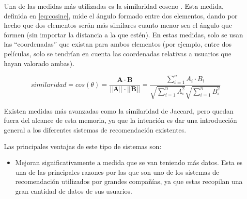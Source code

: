 Una de las medidas más utilizadas es la similaridad coseno \cite{resnick}. Esta medida, definida en \ref{eq:cosine}, mide el ángulo formado entre dos elementos, dando por hecho que dos elementos serán más similares cuanto menor sea el ángulo que formen (sin importar la distancia a la que estén). En estas medidas, solo se usan las ``coordenadas'' que existan para ambos elementos (por ejemplo, entre dos películas, solo se tendrían en cuenta las coordenadas relativas a usuarios que hayan valorado ambas).

\begin{equation}
    similaridad = cos\left(\theta\right) = \frac{\mathbf{A}\cdot \mathbf{B}}{||\mathbf{A}||\cdot ||\mathbf{B}||} = \frac{\sum_{i=1}^{n}{A_i \cdot B_i}}{\sqrt{\sum_{i=1}^{n}{A_i^2}}\sqrt{\sum_{i=1}^{n}{B_i^2}}}
    \label{eq:cosine}
\end{equation}

Existen medidas más avanzadas como la similaridad de Jaccard, pero quedan fuera del alcance de esta memoria, ya que la intención es dar una introducción general a los diferentes sistemas de recomendación existentes.

Las principales ventajas de este tipo de sistemas son:
\begin{itemize}
    \item Mejoran significativamente a medida que se van teniendo más datos. Esta es una de las principales razones por las que son uno de los sistemas de recomendación utilizados por grandes compañías, ya que estas recopilan una gran cantidad de datos de sus usuarios.
\end{itemize}

